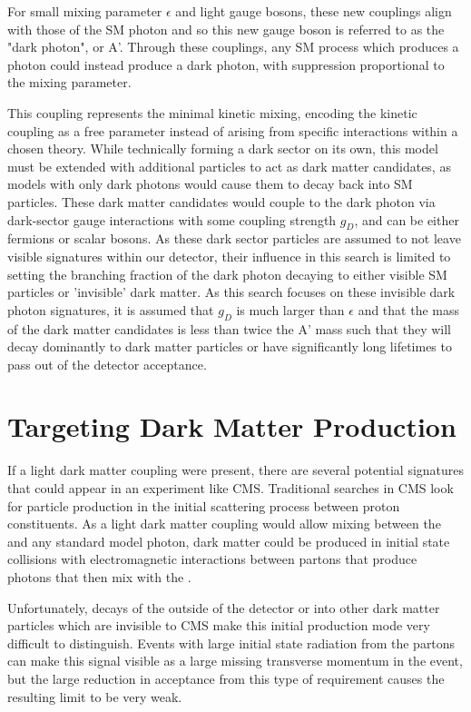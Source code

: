For small mixing parameter $\epsilon$ and light gauge bosons, these new couplings align with those of the SM photon \cite{Bauer_2018} and so this new gauge boson is referred to as the "dark photon", or A'.
Through these couplings, any SM process which produces a photon could instead produce a dark photon, with suppression proportional to the mixing parameter.

This coupling represents the minimal kinetic mixing, encoding the kinetic coupling as a free parameter instead of arising from specific interactions within a chosen theory. 
While technically forming a dark sector on its own, this model must be extended with additional particles to act as dark matter candidates, as models with only dark photons would cause them to decay back into SM particles.
These dark matter candidates would couple to the dark photon via dark-sector gauge interactions with some coupling strength $g_D$, and can be either fermions or scalar bosons.
As these dark sector particles are assumed to not leave visible signatures within our detector, their influence in this search is limited to setting the branching fraction of the dark photon decaying to either visible SM particles or 'invisible' dark matter.
As this search focuses on these invisible dark photon signatures, it is assumed that $g_D$ is much larger than $\epsilon$ and that the mass of the dark matter candidates is less than twice the A' mass such that they will decay dominantly to dark matter particles or have significantly long lifetimes to pass out of the detector acceptance.


\section{Targeting Dark Matter Production}
If a light dark matter coupling were present, there are several potential signatures that could appear in an experiment like CMS.
Traditional searches in CMS look for particle production in the initial scattering process between proton constituents.
As a light dark matter coupling would allow mixing between the \aprime and any standard model photon, dark matter could be produced in initial state collisions with electromagnetic interactions between partons that produce photons that then mix with the \aprime.

Unfortunately, decays of the \aprime outside of the detector or into other dark matter particles which are invisible to CMS make this initial production mode very difficult to distinguish.
Events with large initial state radiation from the partons can make this signal visible as a large missing transverse momentum in the event, but the large reduction in acceptance from this type of requirement causes the resulting limit to be very weak.

